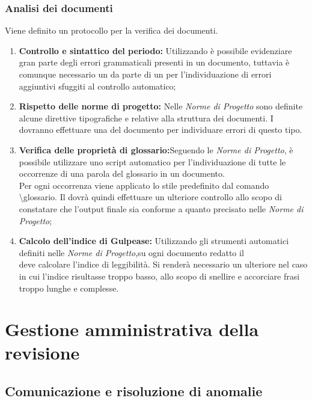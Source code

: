 \subsection{Analisi dei documenti}
Viene definito un protocollo per la verifica dei documenti.
\begin{enumerate}
	\item \textbf{Controllo e sintattico del periodo:} Utilizzando  è possibile evidenziare gran parte degli errori grammaticali presenti in un documento, tuttavia è comunque necessario un  da parte di un  per l'individuazione di errori aggiuntivi sfuggiti al controllo automatico;
	\item \textbf{Rispetto delle norme di progetto:} Nelle \textit{Norme di Progetto} sono definite alcune direttive tipografiche e relative alla struttura dei documenti.
	I  dovranno effettuare una  del documento per individuare errori di questo tipo.
	\item \textbf{Verifica delle proprietà di glossario:}Seguendo le \textit{Norme di Progetto}, è possibile utilizzare uno script automatico per l'individuazione di tutte le occorrenze di una parola del glossario in un documento.\\
	Per ogni occorrenza viene applicato lo stile  predefinito dal comando \textbackslash glossario.
	Il  dovrà quindi effettuare un ulteriore controllo allo scopo di constatare che l’output finale sia conforme a quanto precisato nelle \textit{Norme di Progetto};
	\item \textbf{Calcolo dell'indice di Gulpease:} Utilizzando gli strumenti automatici definiti nelle \textit{Norme di Progetto},su ogni documento redatto il \\  deve calcolare l’indice di leggibilità.
	Si renderà necessario un ulteriore  nel caso in cui l’indice risultasse troppo basso, allo scopo di snellire e accorciare frasi troppo lunghe e complesse.
\end{enumerate}


\chapter{Gestione amministrativa della revisione}
\section{Comunicazione e risoluzione di anomalie}

